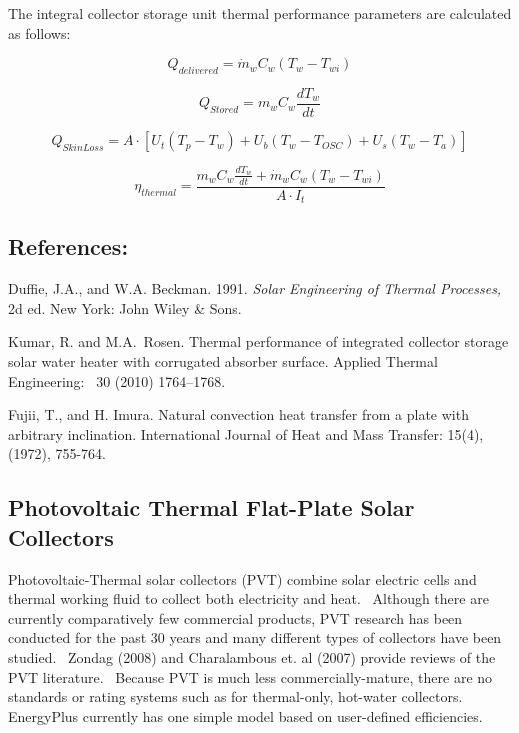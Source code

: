 The integral collector storage unit thermal performance parameters are calculated as follows:

\begin{equation}
{Q_{delivered}} = {\dot m_w}{C_w}\left( {{T_w} - {T_{wi}}} \right)
\end{equation}

\begin{equation}
{Q_{Stored}} = {m_w}{C_w}\frac{{d{T_w}}}{{dt}}
\end{equation}

\begin{equation}
{Q_{SkinLoss}} = A \cdot \left[ {{U_t}\left( {{T_p} - {T_w}} \right) + {U_b}\left( {{T_w} - {T_{OSC}}} \right) + {U_s}\left( {{T_w} - {T_a}} \right)} \right]
\end{equation}

\begin{equation}
{\eta_{thermal}} = \frac{{{m_w}{C_w}\frac{{d{T_w}}}{{dt}} + {{\dot m}_w}{C_w}\left( {{T_w} - {T_{wi}}} \right)}}{{A \cdot {I_t}}}
\end{equation}

\subsection{References:}\label{references-1-016}

Duffie, J.A., and W.A. Beckman. 1991. \emph{Solar Engineering of Thermal Processes,} 2d ed. New York: John Wiley \& Sons.

Kumar, R. and M.A.~Rosen. Thermal performance of integrated collector storage solar water heater with corrugated absorber surface. Applied Thermal Engineering:~ 30 (2010) 1764--1768.

Fujii, T., and H. Imura. Natural convection heat transfer from a plate with arbitrary inclination. International Journal of Heat and Mass Transfer: 15(4), (1972), 755-764.

\subsection{Photovoltaic Thermal Flat-Plate Solar Collectors}\label{photovoltaic-thermal-flat-plate-solar-collectors}

Photovoltaic-Thermal solar collectors (PVT) combine solar electric cells and thermal working fluid to collect both electricity and heat.~ Although there are currently comparatively few commercial products, PVT research has been conducted for the past 30 years and many different types of collectors have been studied.~ Zondag (2008) and Charalambous et. al (2007) provide reviews of the PVT literature.~ Because PVT is much less commercially-mature, there are no standards or rating systems such as for thermal-only, hot-water collectors.~ EnergyPlus currently has one simple model based on user-defined efficiencies.

